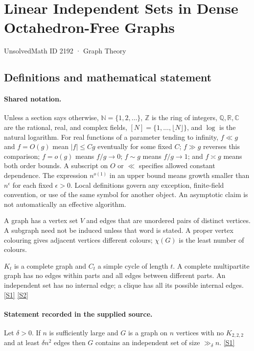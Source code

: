 \documentclass[11pt,a4paper]{article}
\newcommand{\N}{\mathbb{N}}
\newcommand{\Z}{\mathbb{Z}}
\newcommand{\Q}{\mathbb{Q}}
\newcommand{\R}{\mathbb{R}}
\newcommand{\C}{\mathbb{C}}
\newcommand{\sref}[2]{\hyperlink{source:#1:#2}{[S#2]}}
\begin{document}

\setcounter{section}{2191}

\section{Linear Independent Sets in Dense Octahedron-Free Graphs}\label{2192}

{\small\sffamily UnsolvedMath ID 2192 · Graph Theory}

\subsection{Definitions and mathematical statement}

\paragraph{Shared notation.}Unless a section says otherwise, $\N=\{1,2,\ldots\}$,
$\Z$ is the ring of integers, $\Q,\R,\C$ are the rational, real, and complex
fields, $[N]=\{1,\ldots,\lfloor N\rfloor\}$, and $\log$ is the natural
logarithm. For real functions of a parameter tending to infinity,
$f\ll g$ and $f=O(g)$ mean $|f|\leq Cg$ eventually for some fixed $C$;
$f\gg g$ reverses this comparison; $f=o(g)$ means $f/g\to0$;
$f\sim g$ means $f/g\to1$; and $f\asymp g$ means both order bounds.
A subscript on $O$ or $\ll$ specifies allowed constant dependence.
The expression $n^{o(1)}$ in an upper bound means growth smaller than
$n^\epsilon$ for each fixed $\epsilon>0$. Local definitions govern any
exception, finite-field convention, or use of the same symbol for another
object. An asymptotic claim is not automatically an effective algorithm.



A graph has a vertex set $V$ and edges that are unordered pairs of distinct vertices. A subgraph need not be induced unless that word is stated. A proper vertex colouring gives adjacent vertices different colours; $\chi(G)$ is the least number of colours.

$K_t$ is a complete graph and $C_t$ a simple cycle of length $t$. A complete multipartite graph has no edges within parts and all edges between different parts. An independent set has no internal edge; a clique has all its possible internal edges. \sref{2192}{1} \sref{2192}{2}

\paragraph{Statement recorded in the supplied source.}
Let $\delta>0$. If $n$ is sufficiently large and $G$ is a graph on $n$ vertices with no $K_{2,2,2}$ and at least $\delta n^2$ edges then $G$ contains an independent set of size $\gg_\delta n$. \sref{2192}{1}
\end{document}
